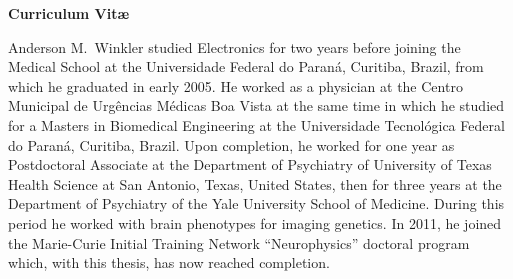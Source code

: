 \cleardoublepage
{}
\vspace*{\fill}
\begin{center}
\begin{Large}
\textbf{Curriculum Vit\ae{}}
\end{Large}
\end{center}

\noindent
Anderson M.\ Winkler studied Electronics for two years before joining the Medical School at the Universidade Federal do Paran\'{a}, Curitiba, Brazil, from which he graduated in early 2005. He worked as a physician at the Centro Municipal de Urg\^{e}ncias M\'{e}dicas Boa Vista at the same time in which he studied for a Masters in Biomedical Engineering at the Universidade Tecnol\'{o}gica Federal do Paran\'{a}, Curitiba, Brazil. Upon completion, he worked for one year as Postdoctoral Associate at the Department of Psychiatry of University of Texas Health Science at San Antonio, Texas, United States, then for three years at the Department of Psychiatry of the Yale University School of Medicine. During this period he worked with brain phenotypes for imaging genetics. In 2011, he joined the Marie-Curie Initial Training Network ``Neurophysics'' doctoral program which, with this thesis, has now reached completion.

\vspace*{\fill}

\cleardoublepage
